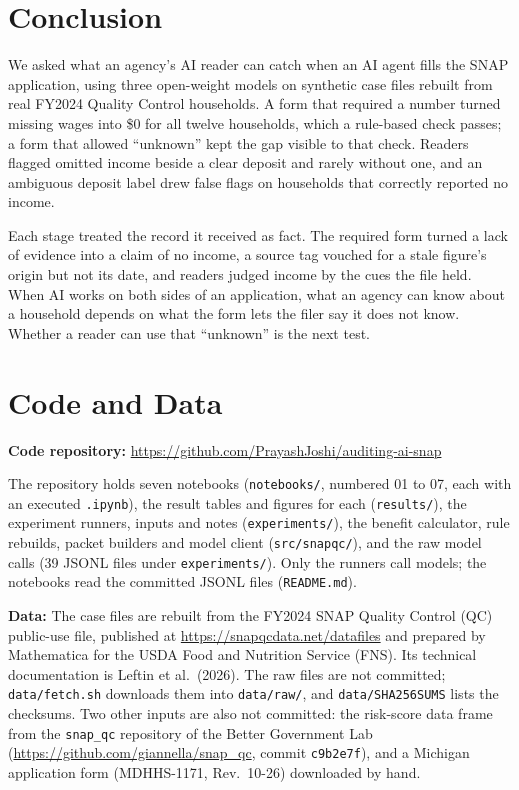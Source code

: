 \documentclass[sigconf,nonacm,screen]{acmart}
\begin{document}
\section{Conclusion}
\label{sec:conclusion}

We asked what an agency's AI reader can catch when an AI agent fills the SNAP application, using three open-weight models on synthetic case files rebuilt from real FY2024 Quality Control households. A form that required a number turned missing wages into \$0 for all twelve households, which a rule-based check passes; a form that allowed ``unknown'' kept the gap visible to that check. Readers flagged omitted income beside a clear deposit and rarely without one, and an ambiguous deposit label drew false flags on households that correctly reported no income.

Each stage treated the record it received as fact. The required form turned a lack of evidence into a claim of no income, a source tag vouched for a stale figure's origin but not its date, and readers judged income by the cues the file held. When AI works on both sides of an application, what an agency can know about a household depends on what the form lets the filer say it does not know. Whether a reader can use that ``unknown'' is the next test.

\section*{Code and Data}

\textbf{Code repository:} \url{https://github.com/PrayashJoshi/auditing-ai-snap}

The repository holds seven notebooks (\texttt{notebooks/}, numbered 01 to 07, each with an executed \texttt{.ipynb}), the result tables and figures for each (\texttt{results/}), the experiment runners, inputs and notes (\texttt{experiments/}), the benefit calculator, rule rebuilds, packet builders and model client (\texttt{src/snapqc/}), and the raw model calls (39 JSONL files under \texttt{experiments/}). Only the runners call models; the notebooks read the committed JSONL files (\texttt{README.md}).

\textbf{Data:} The case files are rebuilt from the FY2024 SNAP Quality Control (QC) public-use file, published at \url{https://snapqcdata.net/datafiles} and prepared by Mathematica for the USDA Food and Nutrition Service (FNS). Its technical documentation is Leftin et al.\ (2026). The raw files are not committed; \texttt{data/fetch.sh} downloads them into \texttt{data/raw/}, and \texttt{data/SHA256SUMS} lists the checksums. Two other inputs are also not committed: the risk-score data frame from the \texttt{snap\_qc} repository of the Better Government Lab (\url{https://github.com/giannella/snap_qc}, commit \texttt{c9b2e7f}), and a Michigan application form (MDHHS-1171, Rev.\ 10-26) downloaded by hand.
\end{document}
